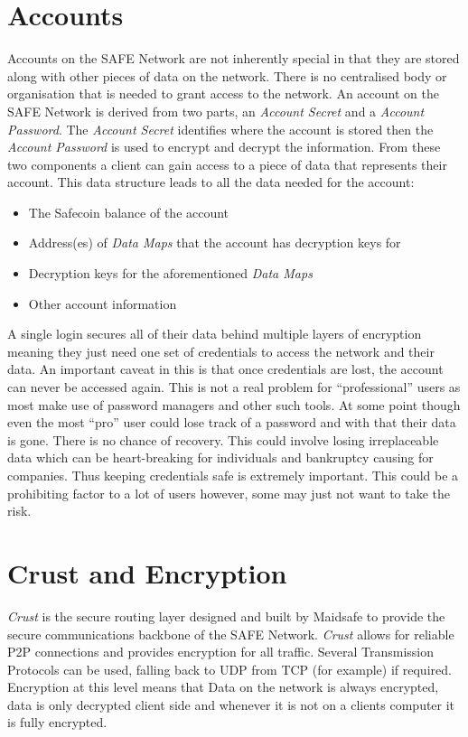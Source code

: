\section{Accounts}

Accounts on the SAFE Network are not inherently special in that they are stored along with other pieces of data on the network. There is no centralised body or organisation that is needed to grant access to the network. An account on the SAFE Network is derived from two parts, an \textit{Account Secret} and a \textit{Account Password}. The \textit{Account Secret} identifies where the account is stored then the \textit{Account Password} is used to encrypt and decrypt the information. From these two components a client can gain access to a piece of data that represents their account. This data structure leads to all the data needed for the account:

\begin{itemize}
	\item The Safecoin balance of the account
	\item Address(es) of \textit{Data Maps} that the account has decryption keys for
	\item Decryption keys for the aforementioned \textit{Data Maps}
	\item Other account information
\end{itemize}
	
A single login secures all of their data behind multiple layers of encryption meaning they just need one set of credentials to access the network and their data. An important caveat in this is that once credentials are lost, the account can never be accessed again. This is not a real problem for ``professional'' users as most make use of password managers and other such tools. At some point though even the most ``pro'' user could lose track of a password and with that their data is gone. There is no chance of recovery. This could involve losing irreplaceable data which can be heart-breaking for individuals and bankruptcy causing for companies. Thus keeping credentials safe is extremely important. This could be a prohibiting factor to a lot of users however, some may just not want to take the risk.

\section{Crust and Encryption}

\textit{Crust} is the secure routing layer designed and built by Maidsafe to provide the secure communications backbone of the SAFE Network. \textit{Crust} allows for reliable P2P connections and provides encryption for all traffic. Several Transmission Protocols can be used, falling back to UDP from TCP (for example) if required. Encryption at this level means that Data on the network is always encrypted, data is only decrypted client side and whenever it is not on a clients computer it is fully encrypted.

